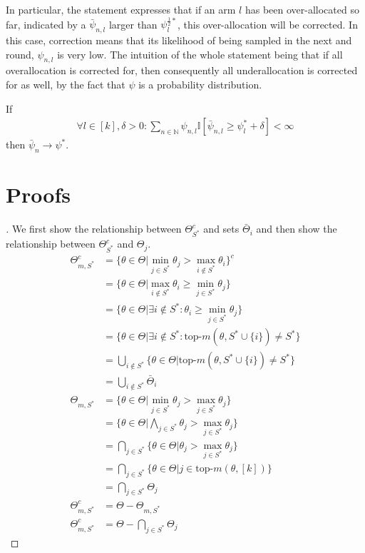 In particular, the statement expresses that if an arm $l$ has been over-allocated so far, indicated by a $\bar{\psi}_{n, l}$ larger than $\psi^{\frac{1}{2}*}_l$, this over-allocation will be corrected. In this case, correction means that its likelihood of being sampled in the next and round, $\psi_{n, l}$ is very low. The intuition of the whole statement being that if all overallocation is corrected for, then consequently all underallocation is corrected for as well, by the fact that $\psi$ is a probability distribution.
\begin{proposition}\label{proposition:optimality_sufficient_condition}
  If
  \begin{align}
    \forall l \in [k], \delta > 0: \sum_{n \in \mathbb{N}} \psi_{n, l} \mathbb{I}[\bar{\psi}_{n, l} \geq \psi^*_l + \delta] < \infty \label{eq:sufficient_condition}
  \end{align}
  then $\bar{\psi}_{n} \rightarrow \psi^*$.
\end{proposition}

\section{Proofs}\label{section:optimal_proofs}
\begin{proof}[]
  We first show the relationship between $\Theta_{S^*}^c$ and sets $\bar{\Theta}_i$ and then show the relationship between $\Theta_{S^*}^c$ and $\Theta_j$.
  \begin{align}
    \Theta_{m, S^*}^c &= \{\theta \in \Theta | \min_{j \in S^*} \theta_j > \max_{i \notin S^*} \theta_i \}^c \\
    &= \{\theta \in \Theta | \max_{i \notin S^*} \theta_i \geq \min_{j \in S^*} \theta_j\} \\
    &= \{\theta \in \Theta | \exists i \notin S^*: \theta_i \geq \min_{j \in S^*} \theta_j\} \\
    &= \{\theta \in \Theta | \exists i \notin S^*: \text{top-}m(\theta, S^* \cup \{i\}) \neq S^*\} \\
    &= \bigcup_{i \notin S^*} \{\theta \in \Theta | \text{top-}m(\theta, S^* \cup \{i\}) \neq S^*\} \\
    &= \bigcup_{i \notin S^*} \bar{\Theta}_i \\
    \Theta_{m, S^*} &= \{\theta \in \Theta | \min_{j \in S^*} \theta_j > \max_{j \in S^*} \theta_j\} \\
    &= \{\theta \in \Theta | \bigwedge_{j \in S^*} \theta_j > \max_{j \in S^*} \theta_j\} \\
    &= \bigcap_{j \in S^*} \{\theta \in \Theta | \theta_j > \max_{j \in S^*} \theta_j\} \\
    &= \bigcap_{j \in S^*} \{\theta \in \Theta | j \in \text{top-}m(\theta, [k])\} \\
    &= \bigcap_{j \in S^*} \Theta_j \\
    \Theta_{m, S^*}^c &= \Theta - \Theta_{m, S^*}\\
    \Theta_{m, S^*}^c &= \Theta - \bigcap_{j \in S^*} \Theta_j
  \end{align}
\end{proof}

